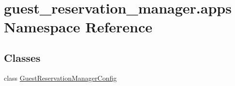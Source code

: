 \hypertarget{namespaceguest__reservation__manager_1_1apps}{\section{guest\-\_\-reservation\-\_\-manager.\-apps Namespace Reference}
\label{namespaceguest__reservation__manager_1_1apps}
}
\subsection*{Classes}
\begin{DoxyCompactItemize}
\item 
class \hyperlink{classguest__reservation__manager_1_1apps_1_1GuestReservationManagerConfig}{Guest\-Reservation\-Manager\-Config}
\end{DoxyCompactItemize}

